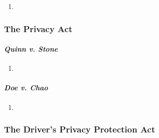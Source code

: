 \begin{enumerate}
    \item 
\end{enumerate}

\subsubsection{The Privacy Act}


\paragraph{\emph{Quinn v. Stone}} %

\begin{enumerate}
    \item 
\end{enumerate}

\paragraph{\emph{Doe v. Chao}} %

\begin{enumerate}
    \item 
\end{enumerate}

\subsubsection{The Driver's Privacy Protection Act}


